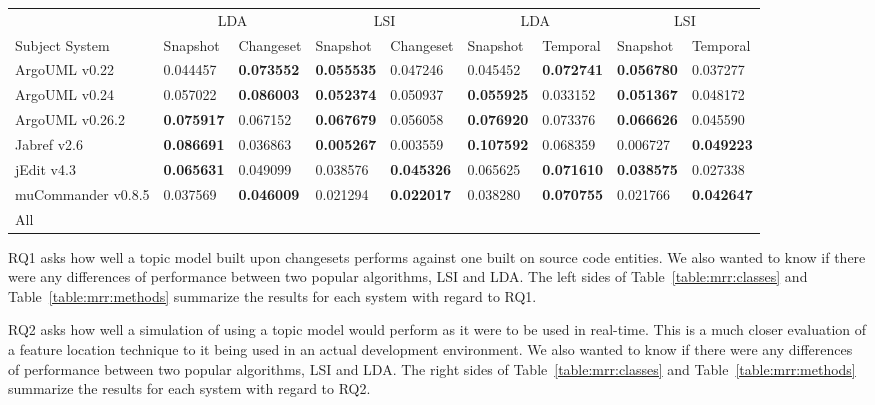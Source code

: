 \begin{table*}[ht]
\renewcommand{\arraystretch}{1.3}
\footnotesize
\centering
\caption{MRR of subject systems methods}
\begin{tabular}{l|ll|ll||ll|ll}
    \toprule
                        & \multicolumn{2}{c|}{LDA}      &  \multicolumn{2}{c||}{LSI}    & \multicolumn{2}{c|}{LDA}      &  \multicolumn{2}{c}{LSI}  \\
    Subject System      & Snapshot      & Changeset     & Snapshot      & Changeset     & Snapshot      & Temporal      & Snapshot      & Temporal  \\
    \midrule
ArgoUML v0.22  & 0.044457 & {\bf 0.073552 } & {\bf 0.055535 } & 0.047246 & 0.045452 & {\bf 0.072741 } & {\bf 0.056780 } & 0.037277 \\
ArgoUML v0.24  & 0.057022 & {\bf 0.086003 } & {\bf 0.052374 } & 0.050937 & {\bf 0.055925 } & 0.033152 & {\bf 0.051367 } & 0.048172 \\
ArgoUML v0.26.2  & {\bf 0.075917 } & 0.067152 & {\bf 0.067679 } & 0.056058 & {\bf 0.076920 } & 0.073376 & {\bf 0.066626 } & 0.045590 \\
Jabref v2.6  & {\bf 0.086691 } & 0.036863 & {\bf 0.005267 } & 0.003559 & {\bf 0.107592 } & 0.068359 & 0.006727 & {\bf 0.049223 } \\
jEdit v4.3  & {\bf 0.065631 } & 0.049099 & 0.038576 & {\bf 0.045326 } & 0.065625 & {\bf 0.071610 } & {\bf 0.038575 } & 0.027338 \\
muCommander v0.8.5 & 0.037569 & {\bf 0.046009 } & 0.021294 & {\bf 0.022017 } & 0.038280 & {\bf 0.070755 } & 0.021766 & {\bf 0.042647 } \\
    \midrule
    All                 &               &               &               &               &               &               &               &           \\
    \bottomrule
\end{tabular}
\label{table:mrr:methods}
\end{table*}





RQ1 asks how well a topic model built upon changesets performs against
one built on source code entities.
We also wanted to know if there were any differences of performance
between two popular algorithms, LSI and LDA.
The left sides of Table~\ref{table:mrr:classes} and Table~\ref{table:mrr:methods}
summarize the results for each system with regard to RQ1.

RQ2 asks how well a simulation of using a topic model would perform as
it were to be used in real-time.
This is a much closer evaluation of a feature location technique to it
being used in an actual development environment.
We also wanted to know if there were any differences of performance
between two popular algorithms, LSI and LDA.
The right sides of Table~\ref{table:mrr:classes} and Table~\ref{table:mrr:methods}
summarize the results for each system with regard to RQ2.

